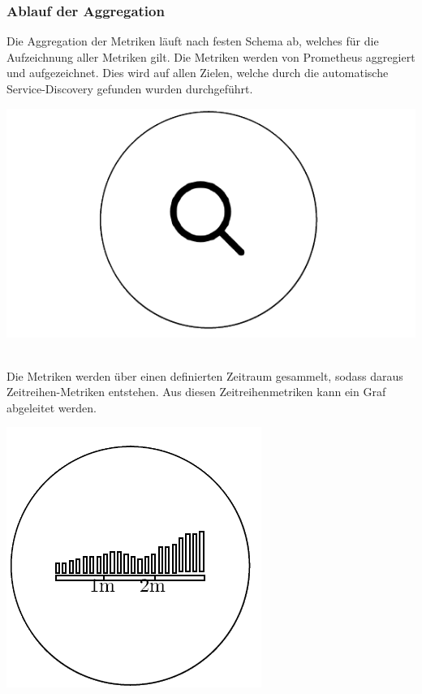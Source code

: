 \documentclass[a4paper,10pt]{scrartcl}
\begin{document}
\subsubsection{Ablauf der Aggregation}

Die Aggregation der Metriken läuft nach festen Schema ab, welches für die Aufzeichnung aller Metriken gilt.
Die Metriken werden von Prometheus aggregiert und aufgezeichnet. Dies wird auf allen Zielen, welche durch die automatische Service-Discovery gefunden wurden durchgeführt.\\

\begin{minipage}{\linewidth}
  \includegraphics[scale=.3]{img/Datenaggregation/LupeNew.png} 
\end{minipage} \\

Die Metriken werden über einen definierten Zeitraum gesammelt, sodass daraus Zeitreihen-Metriken entstehen. Aus diesen Zeitreihenmetriken kann ein Graf abgeleitet werden.\\

\begin{minipage}{\linewidth}
  \includegraphics[scale=.3]{img/Datenaggregation/GrafAggregationNew.png}
\end{minipage} \\
\end{document}
